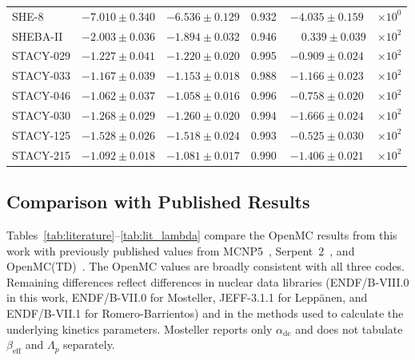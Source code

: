 \documentclass[12pt,preprint]{elsarticle}
\begin{document}
\begin{table}[H]
\begin{tabular}{@{}lccrcc@{}}
SHE-8        & $-7.010 \pm 0.340$ & $-6.536 \pm 0.129$ & 0.932 & $-4.035 \pm 0.159$ & $\times 10^0$ \\
SHEBA-II     & $-2.003 \pm 0.036$ & $-1.894 \pm 0.032$ & 0.946 & $\phantom{-}0.339 \pm 0.039$ & $\times 10^2$ \\
STACY-029    & $-1.227 \pm 0.041$ & $-1.220 \pm 0.020$ & 0.995 & $-0.909 \pm 0.024$ & $\times 10^2$ \\
STACY-033    & $-1.167 \pm 0.039$ & $-1.153 \pm 0.018$ & 0.988 & $-1.166 \pm 0.023$ & $\times 10^2$ \\
STACY-046    & $-1.062 \pm 0.037$ & $-1.058 \pm 0.016$ & 0.996 & $-0.758 \pm 0.020$ & $\times 10^2$ \\
STACY-030    & $-1.268 \pm 0.029$ & $-1.260 \pm 0.020$ & 0.994 & $-1.666 \pm 0.024$ & $\times 10^2$ \\
STACY-125    & $-1.528 \pm 0.026$ & $-1.518 \pm 0.024$ & 0.993 & $-0.525 \pm 0.030$ & $\times 10^2$ \\
STACY-215    & $-1.092 \pm 0.018$ & $-1.081 \pm 0.017$ & 0.990 & $-1.406 \pm 0.021$ & $\times 10^2$ \\
\bottomrule
\end{tabular}
\end{table}

\subsection{Comparison with Published Results}

Tables~\ref{tab:literature}--\ref{tab:lit_lambda} compare the OpenMC results from this work with previously published values from MCNP5~\cite{mosteller2011}, Serpent~2~\cite{leppanen2014}, and OpenMC(TD)~\cite{romero2022}. The OpenMC values are broadly consistent with all three codes. Remaining differences reflect differences in nuclear data libraries (ENDF/B-VIII.0 in this work, ENDF/B-VII.0 for Mosteller, JEFF-3.1.1 for Lepp\"anen, and ENDF/B-VII.1 for Romero-Barrientos) and in the methods used to calculate the underlying kinetics parameters. Mosteller reports only $\alpha_{\mathrm{dc}}$ and does not tabulate $\beta_{\mathrm{eff}}$ and $\Lambda_p$ separately.
\end{document}
